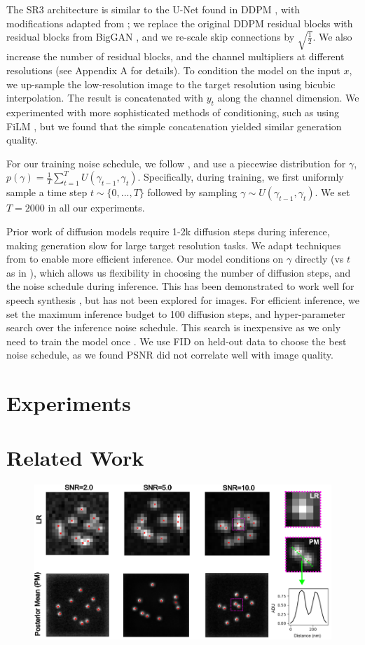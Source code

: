 \documentclass{article}
\begin{document}
The SR3 architecture is similar to the U-Net found in DDPM \cite{ref17}, with modifications adapted from \cite{ref51}; we replace the original DDPM residual blocks with residual blocks from BigGAN \cite{ref4}, and we re-scale skip connections by $\sqrt{\frac{1}{2}}$. We also increase the number of residual blocks, and the channel multipliers at different resolutions (see Appendix A for details). To condition the model on the input $x$, we up-sample the low-resolution image to the target resolution using bicubic interpolation. The result is concatenated with $y_t$ along the channel dimension. We experimented with more sophisticated methods of conditioning, such as using FiLM \cite{ref34}, but we found that the simple concatenation yielded similar generation quality.

For our training noise schedule, we follow \cite{ref6}, and use a piecewise distribution for $\gamma$, $p(\gamma) = \frac{1}{T}\sum_{t=1}^{T} U(\gamma_{t-1}, \gamma_t)$. Specifically, during training, we first uniformly sample a time step $t \sim \{0, ..., T\}$ followed by sampling $\gamma \sim U(\gamma_{t-1}, \gamma_t)$. We set $T = 2000$ in all our experiments.

Prior work of diffusion models \cite{ref17, ref51} require 1-2k diffusion steps during inference, making generation slow for large target resolution tasks. We adapt techniques from \cite{ref6} to enable more efficient inference. Our model conditions on $\gamma$ directly (vs $t$ as in \cite{ref17}), which allows us flexibility in choosing the number of diffusion steps, and the noise schedule during inference. This has been demonstrated to work well for speech synthesis \cite{ref6}, but has not been explored for images. For efficient inference, we set the maximum inference budget to 100 diffusion steps, and hyper-parameter search over the inference noise schedule. This search is inexpensive as we only need to train the model once \cite{ref6}. We use FID on held-out data to choose the best noise schedule, as we found PSNR did not correlate well with image quality.



\section{Experiments}

\section{Related Work}


\begin{figure}
\includegraphics[scale=0.6]{Samples.png}
\end{figure}
\end{document}
